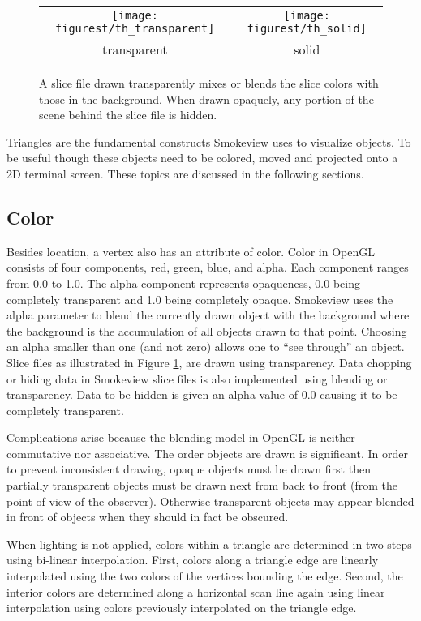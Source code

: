 \begin{figure}[t]
\begin{center}
\begin{tabular}{cc}
\texttt{[image: figurest/th\_transparent]}&
\texttt{[image: figurest/th\_solid]}\\
transparent&solid\\
\end{tabular}
\end{center}
\caption {A slice file drawn transparently mixes or blends the
slice colors with those in the background.  When drawn opaquely,
any portion of the scene behind the slice file is hidden. }
\label{figtransparent}
\end{figure}

Triangles are the fundamental constructs Smokeview uses to
visualize objects.  To be useful though these objects need to be
colored, moved and projected onto a 2D terminal screen. These
topics are discussed in the following sections.
\subsection{Color} Besides location, a vertex also has an attribute of color.
Color in OpenGL consists of four components, red, green, blue, and
alpha. Each component ranges from 0.0 to 1.0. The alpha component
represents opaqueness, 0.0 being completely transparent and 1.0
being completely opaque. Smokeview uses the alpha parameter to
blend the currently drawn object with the background where the
background is the accumulation of all objects drawn to that point.
Choosing an alpha smaller than one (and not zero) allows one to
``see through'' an object. Slice files as illustrated in Figure
\ref{figtransparent}, are drawn using transparency. Data chopping
or hiding data in Smokeview slice files is also implemented using
blending or transparency. Data to be hidden is given an alpha
value of 0.0 causing it to be completely transparent.

Complications arise because the blending model in OpenGL is
neither commutative nor associative. The order objects are drawn
is significant.  In order to prevent inconsistent drawing, opaque
objects must be drawn first then partially transparent objects
must be drawn next from back to front (from the point of view of
the observer). Otherwise transparent objects may appear blended in
front of objects when they should in fact be obscured.

When lighting is not applied, colors within a triangle are
determined in two steps using bi-linear interpolation. First,
colors along a triangle edge are linearly interpolated using the
two colors of the vertices bounding the edge. Second, the interior
colors are determined along a horizontal scan line again using
linear interpolation using colors previously interpolated on the
triangle edge.

